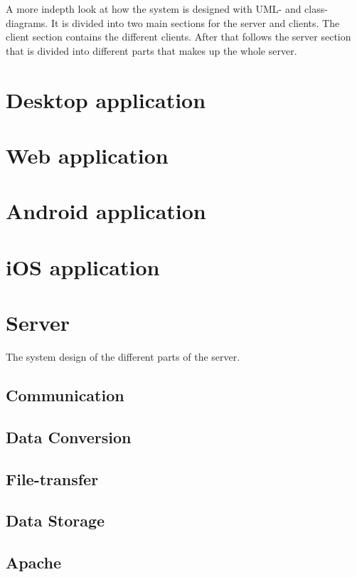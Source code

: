 
A more indepth look at how the system is designed with UML- and class-diagrams. It is divided into two main sections for the server and clients. The client section contains the different clients. After that follows the server section that is divided into different parts that makes up the whole server. 

\section{Desktop application}

\FloatBarrier

\section{Web application}


\FloatBarrier

\section{Android application}

\FloatBarrier

\section{iOS application}

\FloatBarrier

\section{Server}
The system design of the different parts of the server.
\subsection{Communication}

\FloatBarrier
\subsection{Data Conversion}

\FloatBarrier
\subsection{File-transfer}

\FloatBarrier
\subsection{Data Storage}

\FloatBarrier
\subsection{Apache}

\FloatBarrier
